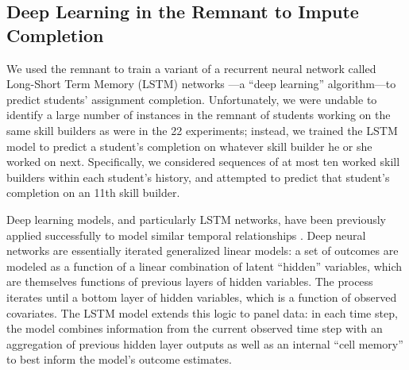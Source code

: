 \subsection{Deep Learning in the Remnant to Impute
  Completion}\label{sec:deepLearning}

We used the remnant to train a variant of a recurrent neural network \cite{} called
Long-Short Term Memory (LSTM) networks \cite{}---a ``deep
learning'' algorithm---to
predict students' assignment completion.
Unfortunately, we were undable to identify a large number of instances
in the remnant of students working on the same skill builders as were
in the 22 experiments; instead, we trained the LSTM model to predict a
student's completion on whatever skill builder he or she worked on
next.
Specifically, we considered sequences of at most ten worked skill
builders within each student's history, and attempted to predict that
student's completion on an 11th skill builder.

Deep learning models, and particularly LSTM networks, have been previously applied
successfully to model similar temporal relationships \cite{}. %
Deep neural networks are essentially iterated generalized linear
models: a set of outcomes are modeled as a function of a linear
combination of latent ``hidden'' variables, which are themselves
functions of previous layers of hidden variables.
The process iterates until a bottom layer of hidden variables, which
is a function of observed covariates.
The LSTM model extends this logic to panel data: in each time step,
the model combines information from the current observed time step
with an aggregation of previous hidden layer outputs as well as an
internal ``cell memory'' to best inform the model’s outcome
estimates.

